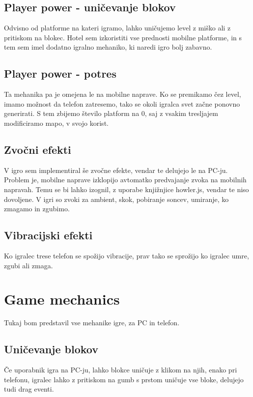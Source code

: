 \documentclass[a4paper,11pt]{article}
\begin{document}
\subsection{Player power - uničevanje blokov}

Odvisno od platforme na kateri igramo, lahko uničujemo level z miško ali z pritiskom na blokec. Hotel sem izkoristiti vse prednosti mobilne platforme, in s tem sem imel dodatno igralno mehaniko, ki naredi igro bolj zabavno.

\subsection{Player power - potres}

Ta mehanika pa je omejena le na mobilne naprave. Ko se premikamo čez level, imamo možnost da telefon zatresemo, tako se okoli igralca svet začne ponovno generirati. S tem zbijemo število platform na 0, saj z vsakim tresljajem modificiramo mapo, v svojo korist.

\subsection{Zvočni efekti}

V igro sem implementiral še zvočne efekte, vendar te delujejo le na PC-ju. Problem je, mobilne naprave izklopijo avtomatko predvajanje zvoka na mobilnih napravah. Temu se bi lahko izognil, z uporabe knjižnjice howler.js, vendar te niso dovoljene. V igri so zvoki za ambient, skok, pobiranje soncev, umiranje, ko zmagamo in zgubimo.

\subsection{Vibracijski efekti}

Ko igralec trese telefon se spožijo vibracije, prav tako se sprožijo ko igralec umre, zgubi ali zmaga.

\section{Game mechanics}

Tukaj bom predstavil vse mehanike igre, za PC in telefon.

\subsection{Uničevanje blokov}
Če uporabnik igra na PC-ju, lahko blokce uničuje z klikom na njih, enako pri telefonu, igralec lahko z pritiskom na gumb s prstom uničuje vse bloke, delujejo tudi drag eventi.
\end{document}
